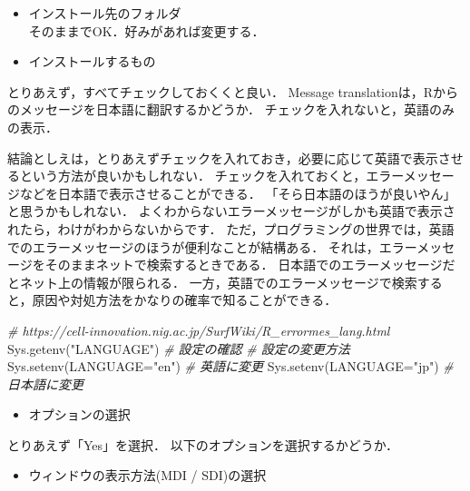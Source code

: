 \documentclass[
]{article}
\newenvironment{Shaded}{\begin{snugshade}}{\end{snugshade}}
\newcommand{\AttributeTok}[1]{\textcolor[rgb]{0.77,0.63,0.00}{#1}}
\newcommand{\CommentTok}[1]{\textcolor[rgb]{0.56,0.35,0.01}{\textit{#1}}}
\newcommand{\FunctionTok}[1]{\textcolor[rgb]{0.00,0.00,0.00}{#1}}
\newcommand{\NormalTok}[1]{#1}
\newcommand{\StringTok}[1]{\textcolor[rgb]{0.31,0.60,0.02}{#1}}
\providecommand{\tightlist}{%
  \setlength{\itemsep}{0pt}\setlength{\parskip}{0pt}}
\begin{document}
\begin{itemize}
\tightlist
\item
  インストール先のフォルダ\\
  そのままでOK．好みがあれば変更する．
\end{itemize}

\begin{itemize}
\tightlist
\item
  インストールするもの
\end{itemize}

とりあえず，すべてチェックしておくくと良い．
Message translationは，Rからのメッセージを日本語に翻訳するかどうか．
チェックを入れないと，英語のみの表示．

結論としえは，とりあえずチェックを入れておき，必要に応じて英語で表示させるという方法が良いかもしれない．
チェックを入れておくと，エラーメッセージなどを日本語で表示させることができる．
「そら日本語のほうが良いやん」と思うかもしれない．
よくわからないエラーメッセージがしかも英語で表示されたら，わけがわからないからです．
ただ，プログラミングの世界では，英語でのエラーメッセージのほうが便利なことが結構ある．
それは，エラーメッセージをそのままネットで検索するときである．
日本語でのエラーメッセージだとネット上の情報が限られる．
一方，英語でのエラーメッセージで検索すると，原因や対処方法をかなりの確率で知ることができる．

\begin{Shaded}
\begin{Highlighting}[]
  \CommentTok{\# https://cell{-}innovation.nig.ac.jp/SurfWiki/R\_errormes\_lang.html}
  \FunctionTok{Sys.getenv}\NormalTok{(}\StringTok{"LANGUAGE"}\NormalTok{) }\CommentTok{\# 設定の確認}
  \CommentTok{\# 設定の変更方法}
  \FunctionTok{Sys.setenv}\NormalTok{(}\AttributeTok{LANGUAGE=}\StringTok{"en"}\NormalTok{) }\CommentTok{\# 英語に変更}
  \FunctionTok{Sys.setenv}\NormalTok{(}\AttributeTok{LANGUAGE=}\StringTok{"jp"}\NormalTok{) }\CommentTok{\# 日本語に変更}
\end{Highlighting}
\end{Shaded}

\begin{itemize}
\tightlist
\item
  オプションの選択
\end{itemize}

とりあえず「Yes」を選択．
以下のオプションを選択するかどうか．

\begin{itemize}
\tightlist
\item
  ウィンドウの表示方法(MDI / SDI)の選択
\end{itemize}
\end{document}
